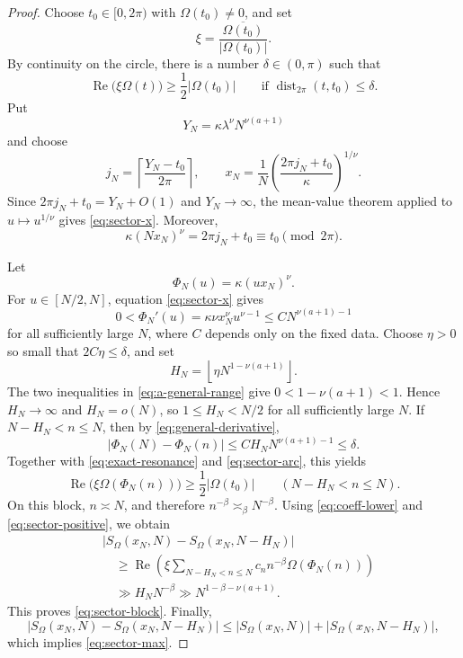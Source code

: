 \documentclass[11pt]{amsart}
\theoremstyle{plain}
\theoremstyle{definition}
\theoremstyle{remark}
\newcommand{\distT}{\operatorname{dist}_{2\pi}}
\numberwithin{equation}{section}
\begin{document}
\begin{proof}
Choose $t_0\in[0,2\pi)$ with $\Omega(t_0)\ne0$, and set
\[
  \xi=\frac{\overline{\Omega(t_0)}}{|\Omega(t_0)|}.
\]
By continuity on the circle, there is a number $\delta\in(0,\pi)$ such that
\begin{equation}\label{eq:sector-arc}
  \operatorname{Re}\bigl(\xi\Omega(t)\bigr)
  \ge\frac12|\Omega(t_0)|
  \qquad
  \text{if }\distT(t,t_0)\le\delta.
\end{equation}
Put
\[
  Y_N=\kappa\lambda^\nu N^{\nu(a+1)}
\]
and choose
\begin{equation}\label{eq:j-choice}
  j_N=\left\lceil\frac{Y_N-t_0}{2\pi}\right\rceil,
  \qquad
  x_N=\frac1N
  \left(\frac{2\pi j_N+t_0}{\kappa}\right)^{1/\nu}.
\end{equation}
Since $2\pi j_N+t_0=Y_N+O(1)$ and $Y_N\to\infty$, the mean-value theorem applied to $u\mapsto u^{1/\nu}$ gives \eqref{eq:sector-x}.  Moreover,
\begin{equation}\label{eq:exact-resonance}
  \kappa(Nx_N)^\nu=2\pi j_N+t_0
  \equiv t_0\pmod{2\pi}.
\end{equation}

Let
\[
  \Phi_N(u)=\kappa(ux_N)^\nu.
\]
For $u\in[N/2,N]$, equation \eqref{eq:sector-x} gives
\begin{equation}\label{eq:general-derivative}
  0<\Phi_N'(u)
  =\kappa\nu x_N^\nu u^{\nu-1}
  \le C N^{\nu(a+1)-1}
\end{equation}
for all sufficiently large $N$, where $C$ depends only on the fixed data.  Choose $\eta>0$ so small that $2C\eta\le\delta$, and set
\begin{equation}\label{eq:H-choice-general}
  H_N=\left\lfloor\eta N^{1-\nu(a+1)}\right\rfloor.
\end{equation}
The two inequalities in \eqref{eq:a-general-range} give
$0<1-\nu(a+1)<1$.  Hence $H_N\to\infty$ and $H_N=o(N)$, so $1\le H_N<N/2$ for all sufficiently large $N$.  If $N-H_N<n\le N$, then by \eqref{eq:general-derivative},
\[
  |\Phi_N(N)-\Phi_N(n)|
  \le C H_NN^{\nu(a+1)-1}
  \le\delta.
\]
Together with \eqref{eq:exact-resonance} and \eqref{eq:sector-arc}, this yields
\begin{equation}\label{eq:sector-positive}
  \operatorname{Re}\bigl(\xi\Omega(\Phi_N(n))\bigr)
  \ge\frac12|\Omega(t_0)|
  \qquad(N-H_N<n\le N).
\end{equation}
On this block, $n\asymp N$, and therefore $n^{-\beta}\asymp_{\beta}N^{-\beta}$.  Using \eqref{eq:coeff-lower} and \eqref{eq:sector-positive}, we obtain
\begin{align*}
  &\bigl|S_{\Omega}(x_N,N)-S_{\Omega}(x_N,N-H_N)\bigr|\\
  &\quad\ge
  \operatorname{Re}\!\left(
    \xi\sum_{N-H_N<n\le N}
    c_n n^{-\beta}\Omega(\Phi_N(n))
  \right)\\
  &\quad\gg H_NN^{-\beta}
  \gg N^{1-\beta-\nu(a+1)}.
\end{align*}
This proves \eqref{eq:sector-block}.  Finally,
\[
  |S_{\Omega}(x_N,N)-S_{\Omega}(x_N,N-H_N)|
  \le |S_{\Omega}(x_N,N)|+|S_{\Omega}(x_N,N-H_N)|,
\]
which implies \eqref{eq:sector-max}.
\end{proof}
\end{document}

